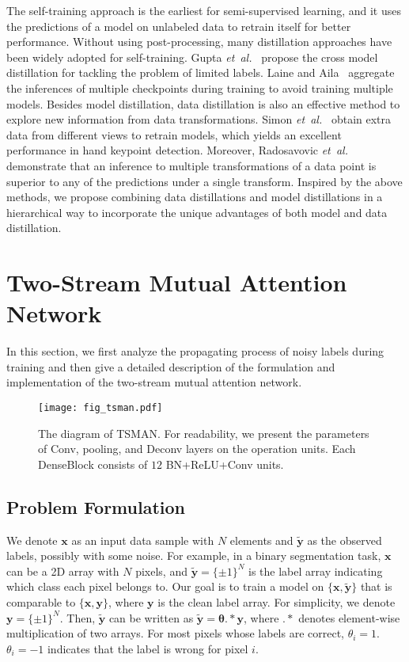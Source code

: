 \documentclass[letterpaper]{article} %
\begin{document}
The self-training approach is the earliest for semi-supervised learning, and it uses the predictions of a model on unlabeled data to retrain itself for better performance.
Without using post-processing, many distillation approaches have been widely adopted for self-training.
Gupta \emph{et~al.}~ propose the cross model distillation for tackling the problem of limited labels.
Laine and Aila~ aggregate the inferences of multiple checkpoints during training to avoid training multiple models.
Besides model distillation, data distillation is also an effective method to explore new information from data transformations.
Simon \emph{et~al.}~ obtain extra data from different views to retrain models, which yields an excellent performance in hand keypoint detection.
Moreover, Radosavovic \emph{et~al.}~ demonstrate that an inference to multiple transformations of a data point is superior to any of the predictions under a single transform.
Inspired by the above methods, we propose combining data distillations and model distillations in a hierarchical way to incorporate the unique advantages of both model and data distillation.
\section{Two-Stream Mutual Attention Network}\label{sec:dan}
In this section, we first analyze the propagating process of noisy labels during training and then give a detailed description of the formulation and implementation of the two-stream mutual attention network.

\begin{figure*}[t]
	\begin{center}
		\texttt{[image: fig\_tsman.pdf]}
	\end{center}
	\caption{The diagram of TSMAN. For readability, we present the parameters of Conv, pooling, and Deconv layers on the operation units. Each DenseBlock consists of $12$ BN+ReLU+Conv units.}
	\label{fig:dan}
\end{figure*}\subsection{Problem Formulation}
We denote $\boldsymbol{x}$ as an input data sample with $N$ elements and $\tilde{\boldsymbol{y}}$ as the observed labels, possibly with some noise. For example, in a binary segmentation task, $\boldsymbol{x}$ can be a 2D array with $N$ pixels, and $\tilde{\boldsymbol{y}}=\{\pm 1\}^{N}$ is the label array indicating which class each pixel belongs to. Our goal is to train a model on $\{\boldsymbol{x},\tilde{\boldsymbol{y}}\}$ that is comparable to $\{\boldsymbol{x},\boldsymbol{y}\}$, where $\boldsymbol{y}$ is the clean label array. For simplicity, we denote $\boldsymbol{y}=\{\pm 1\}^N$. Then, $\tilde{\boldsymbol{y}}$ can be written as $\tilde{\boldsymbol{y}}=\bm{\theta}.*\boldsymbol{y}$, where $.*$ denotes element-wise multiplication of two arrays. For most pixels whose labels are correct, $\theta_i=1$. $\theta_i= -1$ indicates that the label is wrong for pixel $i$. 
\end{document}
